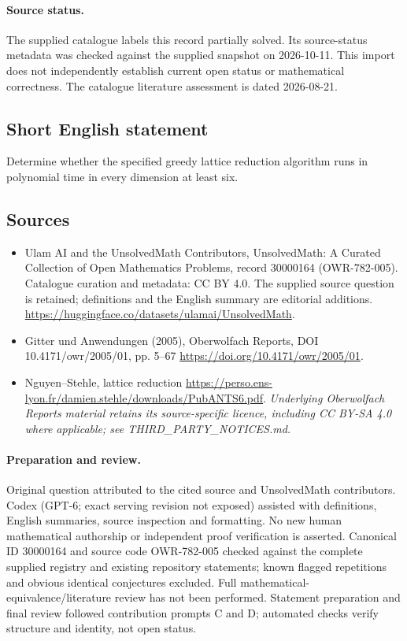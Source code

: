 \documentclass[11pt]{article}
\begin{document}
\paragraph{Source status.}
The supplied catalogue labels this record partially solved. Its source-status metadata was checked against the supplied snapshot on 2026-10-11. This import does not independently establish current open status or mathematical correctness. The catalogue literature assessment is dated 2026-08-21.
\subsection{Short English statement}
Determine whether the specified greedy lattice reduction algorithm runs in polynomial time in every dimension at least six.
\subsection{Sources}
\begin{itemize}
\item[S1] Ulam AI and the UnsolvedMath Contributors, UnsolvedMath: A Curated Collection of Open Mathematics Problems, record 30000164 (OWR-782-005). Catalogue curation and metadata: CC BY 4.0. The supplied source question is retained; definitions and the English summary are editorial additions.
\url{https://huggingface.co/datasets/ulamai/UnsolvedMath}.
\item[S2] Gitter und Anwendungen (2005), Oberwolfach Reports, DOI 10.4171/owr/2005/01, pp. 5--67
\url{https://doi.org/10.4171/owr/2005/01}.
\item[S3] Nguyen--Stehle, lattice reduction
\url{https://perso.ens-lyon.fr/damien.stehle/downloads/PubANTS6.pdf}.
\textit{Underlying Oberwolfach Reports material retains its source-specific licence, including CC BY-SA 4.0 where applicable; see THIRD\_PARTY\_NOTICES.md.}
\end{itemize}
\paragraph{Preparation and review.}
Original question attributed to the cited source and UnsolvedMath contributors. Codex (GPT-6; exact serving revision not exposed) assisted with definitions, English summaries, source inspection and formatting. No new human mathematical authorship or independent proof verification is asserted. Canonical ID 30000164 and source code OWR-782-005 checked against the complete supplied registry and existing repository statements; known flagged repetitions and obvious identical conjectures excluded. Full mathematical-equivalence/literature review has not been performed. Statement preparation and final review followed contribution prompts C and D; automated checks verify structure and identity, not open status.
\label{end:30000164}
\end{document}

